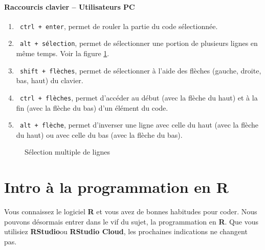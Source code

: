 \documentclass[10.5pt,a4paper]{article}
\newcommand{\rcode}[1]{\texttt{\color{rstudio} #1}}
\begin{document}
      \paragraph{Raccourcis clavier -- Utilisateurs PC}
      \begin{enumerate}
        \item \rcode{ctrl + enter}, permet de rouler la partie du code sélectionnée.
        \item \rcode{alt + sélection}, permet de sélectionner une portion de plusieurs lignes en même temps. Voir la figure \ref{altSelect}.
        \item \rcode{shift + flèches}, permet de sélectionner à l'aide des flèches (gauche, droite, bas, haut) du clavier.
        \item \rcode{ctrl + flèches}, permet d'accéder au début (avec la flèche du haut) et à la fin (avec la flèche du bas) d'un élément du code.
        \item \rcode{alt + flèche}, permet d'inverser une ligne avec celle du haut (avec la flèche du haut) ou avec celle du bas (avec la flèche du bas).
      \end{enumerate}
      
            \begin{figure}[H]
      \centering
      \caption{Sélection multiple de lignes}
      \label{altSelect}
      \end{figure}
      
\section{Intro à la programmation en R}
Vous connaissez le logiciel \textbf{R} et vous avez de bonnes habitudes pour coder. Nous pouvons désormais entrer dans le vif du sujet, la programmation en \textbf{R}. Que vous utilisiez \textbf{RStudio}ou \textbf{RStudio Cloud}, les prochaines indications ne changent pas. 
      
\end{document}
